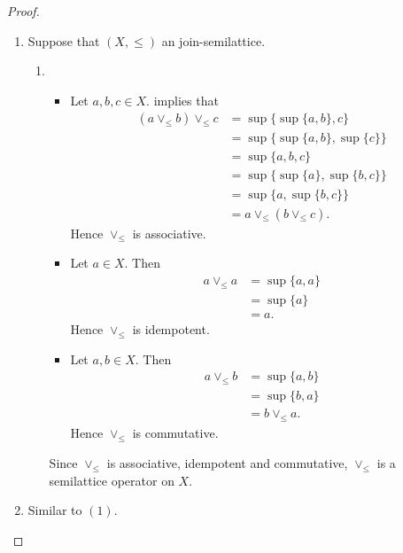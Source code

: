 \documentclass{book}
\begin{document}
	\begin{proof}\
		\begin{enumerate}
			\item Suppose that $(X, \leq)$ an join-semilattice. 
			\begin{enumerate}
				\item \begin{itemize}
					\item Let $a,b,c \in X$.  implies that
					\begin{align*}
						(a\vee_{\leq}b) \vee_{\leq} c
						& = \sup \{\sup \{a, b\}, c\} \\
						& = \sup \{\sup \{a, b\}, \sup \{c\} \} \\
						& = \sup \{a, b, c\} \\
						& = \sup \{\sup \{a \}, \sup \{b, c\} \} \\
						& = \sup \{a, \sup \{b, c\} \} \\
						& = a \vee_{\leq} (b \vee_{\leq} c).
					\end{align*}
					Hence $\vee_{\leq}$ is associative.
					\item Let $a \in X$. Then 
					\begin{align*}
						a \vee_{\leq} a
						& = \sup \{a, a\} \\
						& = \sup \{a\} \\
						& = a.
					\end{align*}
					Hence $\vee_{\leq}$ is idempotent.
					\item Let $a,b \in X$. Then 
					\begin{align*}
						a \vee_{\leq} b
						& = \sup \{a, b\} \\
						& = \sup \{b, a\} \\
						& = b \vee_{\leq} a.
					\end{align*}
					Hence $\vee_{\leq}$ is commutative.
				\end{itemize}
				Since $\vee_{\leq}$ is associative, idempotent and commutative, $\vee_{\leq}$ is a semilattice operator on $X$.
			\end{enumerate}
			\item Similar to $(1)$.
		\end{enumerate}
	\end{proof}
	
\end{document}
